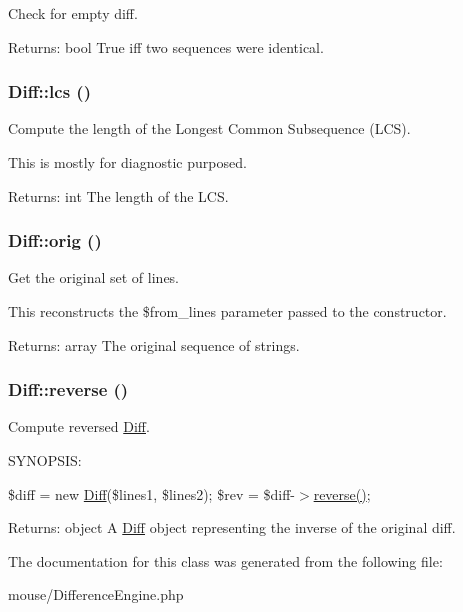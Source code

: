 Check for empty diff.

\begin{Desc}
\item[Returns:]bool True iff two sequences were identical. \end{Desc}
\hypertarget{classDiff_aafd3d0e3e8bd79dc39de040cf7e7005}{
\subsubsection[{lcs}]{\setlength{\rightskip}{0pt plus 5cm}Diff::lcs ()}}
\label{classDiff_aafd3d0e3e8bd79dc39de040cf7e7005}


Compute the length of the Longest Common Subsequence (LCS).

This is mostly for diagnostic purposed.

\begin{Desc}
\item[Returns:]int The length of the LCS. \end{Desc}
\hypertarget{classDiff_531ed79c9805cfca36f8d827120af685}{
\subsubsection[{orig}]{\setlength{\rightskip}{0pt plus 5cm}Diff::orig ()}}
\label{classDiff_531ed79c9805cfca36f8d827120af685}


Get the original set of lines.

This reconstructs the \$from\_\-lines parameter passed to the constructor.

\begin{Desc}
\item[Returns:]array The original sequence of strings. \end{Desc}
\hypertarget{classDiff_4ce63c7d52bd2081787cd9603e441763}{
\subsubsection[{reverse}]{\setlength{\rightskip}{0pt plus 5cm}Diff::reverse ()}}
\label{classDiff_4ce63c7d52bd2081787cd9603e441763}


Compute reversed \hyperlink{classDiff}{Diff}.

SYNOPSIS:

\$diff = new \hyperlink{classDiff}{Diff}(\$lines1, \$lines2); \$rev = \$diff-$>$\hyperlink{classDiff_4ce63c7d52bd2081787cd9603e441763}{reverse()}; \begin{Desc}
\item[Returns:]object A \hyperlink{classDiff}{Diff} object representing the inverse of the original diff. \end{Desc}


The documentation for this class was generated from the following file:\begin{CompactItemize}
\item 
mouse/DifferenceEngine.php\end{CompactItemize}
